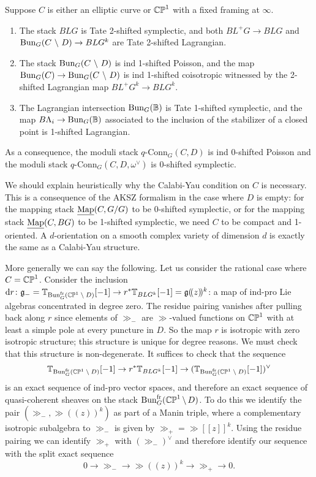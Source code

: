 \documentclass[10pt, oneside]{article}
\newcommand{\map}{\ul{\mr{Map}}}
\newcommand{\qconn}{q\text{-Conn}}
\renewcommand{\d}{\mathrm{d}}
\newcommand{\fr}{\mathrm{fr}}
\begin{document}
\begin{conjecture}
Suppose $C$ is either an elliptic curve or $\mathbb{CP}^1$ with a fixed framing at $\infty$.
\vspace{-10pt}
\begin{enumerate}
\item The stack $BLG$ is Tate 2-shifted symplectic, and both $BL^+G \to BLG$ and $\operatorname{Bun}_G(C \ \backslash \  D) \to BLG^k$ are Tate 2-shifted Lagrangian.  
\item The stack $\operatorname{Bun}_G(C \ \backslash \  D)$ is ind 1-shifted Poisson, and the map $\operatorname{Bun}_G(C) \to \operatorname{Bun}_G(C \ \backslash \  D)$ is ind 1-shifted coisotropic witnessed by the 2-shifted Lagrangian map $BL^+G^k \to BLG^k$.
\item The Lagrangian intersection $\operatorname{Bun}_G(\mathbb{B})$ is Tate 1-shifted symplectic, and the map $B\Lambda_i \to \operatorname{Bun}_G(\mathbb{B})$ associated to the inclusion of the stabilizer of a closed point is 1-shifted Lagrangian.
\end{enumerate}
\vspace{-10pt}
As a consequence, the moduli stack $\qconn_G(C,D)$ is ind 0-shifted Poisson and the moduli stack $\qconn_G(C,D, \omega^\vee)$ is 0-shifted symplectic.
\end{conjecture}

\begin{remark}
We should explain heuristically why the Calabi-Yau condition on $C$ is necessary.  This is a consequence of the AKSZ formalism in the case where $D$ is empty: for the mapping stack $\map(C, G/G)$ to be 0-shifted symplectic, or for the mapping stack $\map(C,BG)$ to be 1-shifted symplectic, we need $C$ to be compact and 1-oriented.  A $d$-orientation on a smooth complex variety of dimension $d$ is exactly the same as a Calabi-Yau structure.

More generally we can say the following.  Let us consider the rational case where $C = \mathbb{CP}^1$.  Consider the inclusion $\d r \colon \gg_- = \bb T_{\bun_G^\fr(\bb{CP}^1 \! \bs \! D)}[-1] \to r^*\bb T_{BLG^k}[-1] = \gg(\!(z)\!)^k$: a map of ind-pro Lie algebras concentrated in degree zero.  The residue pairing vanishes after pulling back along $r$ since elements of $\gg_-$ are  $\gg$-valued functions on $\mathbb{CP}^1$ with at least a simple pole at every puncture in $D$.  So the map $r$ is isotropic with zero isotropic structure; this structure is unique for degree reasons.  We must check that this structure is non-degenerate.  It suffices to check that the sequence
\[\bb T_{\bun_G^\fr(\bb{CP}^1 \! \bs \! D)}[-1] \to r^*\bb T_{BLG^k}[-1] \to (\bb T_{\bun_G^\fr(\bb{CP}^1 \! \bs \! D)}[-1])^\vee\]
is an exact sequence of ind-pro vector spaces, and therefore an exact sequence of quasi-coherent sheaves on the stack $\bun_G^\fr(\bb{CP}^1 \! \bs \! D)$.  To do this we identify the pair $(\gg_-, \gg(\!(z)\!)^k)$ as part of a Manin triple, where a complementary isotropic subalgebra to $\gg_-$ is given by $\gg_+ = \gg[[z]]^k$.  Using the residue pairing we can identify $\gg_+$ with $(\gg_-)^\vee$ and therefore identify our sequence with the split exact sequence
\[0 \to \gg_- \to \gg(\!(z)\!)^k \to \gg_+ \to 0.\]
\end{remark}
\end{document}
